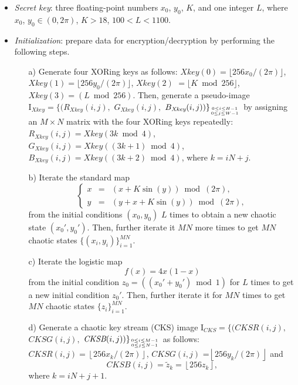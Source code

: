 \documentclass[twocolumn]{svjour3}
\newcommand\mymatrix[1]{\bm{\mathrm{#1}}}
\newcommand\Xkey{\textit{Xkey}}
\newcommand\CKS{\textit{CKS}}
\begin{document}
\begin{itemize}
\item
\textit{Secret key}: three floating-point numbers $x_0$, $y_0$, $K$,
and one integer $L$, where $x_0$, $y_0\in(0, 2\pi)$, $K>18$,
$100<L<1100$.

\item
\textit{Initialization}: prepare data for encryption/decryption by
performing the following steps.
\begin{itemize}
\item[a)]
Generate four XORing keys as follows: $\textit{Xkey}(0)=\lfloor
256x_0/(2\pi)\rfloor$, $\textit{Xkey}(1)=\lfloor
256y_0/(2\pi)\rfloor$, $\textit{Xkey}(2)$ $=\lfloor K\bmod 256
\rfloor$, $\textit{Xkey}(3)=(L \bmod 256)$. Then, generate a pseudo-image
$\mymatrix{I}_{\Xkey}=\{(R_{\Xkey}(i,j),$ $G_{\Xkey}(i,j),$ $
B_{\Xkey}(i,j))\}_{0\leq i\leq H-1 \atop 0\leq j\leq W-1}$ by
assigning an $M\times N$ matrix with the four XORing keys repeatedly:\\
$R_{\Xkey}(i,j)=\Xkey(3k\bmod 4)$,\\
$G_{\Xkey}(i,j)=\Xkey((3k+1)\bmod 4)$,\\
$B_{\Xkey}(i,j)=\Xkey((3k+2)\bmod 4)$, where $k=iN+j$.

\item[b)]
Iterate the standard map
\begin{equation*}
\left\{
\begin{array}{lcl}
x   &=&   (x+K\sin(y))\bmod(2\pi),\\
y   &=&  (y+x+K\sin(y))\bmod(2\pi),
\end{array}
\right.
\end{equation*}
from the initial conditions $(x_0,y_0)$ $L$ times to obtain a new chaotic state
$(x_0', y_0')$. Then, further iterate it $MN$ more times to get
$MN$ chaotic states $\{(x_i,y_i)\}_{i=1}^{MN}$.

\item[c)]
Iterate the logistic map
\begin{equation}
\label{eq:logistic} f(x)=4x(1-x)
\end{equation}
from the initial condition $z_0=((x_0'+y_0')\bmod 1)$ for $L$ times to get a new
initial condition $z_0'$. Then, further iterate it for $MN$ times to
get $MN$ chaotic states $\{z_i\}_{i=1}^{MN}$.

\item[d)]
Generate a chaotic key stream (CKS) image $\mymatrix{I}_{\CKS}=\{(\textit{CKSR}(i,j),$ $\textit{CKSG}(i,j),$
$\textit{CKSB}(i,j))\}_{0\leq i\leq M-1 \atop 0\leq j\leq N-1}$ as
follows:
$\textit{CKSR}(i,j)=\left\lfloor
256x_k/(2\pi)\right\rfloor$, $\textit{CKSG}(i,j)$ =$\left\lfloor
256y_k/(2\pi)\right\rfloor$ and
\begin{equation}\label{eq:CKSB}
\textit{CKSB}(i,j)=\tilde{z}_k=\left\lfloor
256z_k\right\rfloor,
\end{equation}
where $k=iN+j+1$.
\end{itemize}


\end{itemize}
\end{document}

